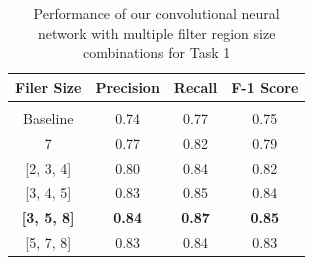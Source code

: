 \begin{table}[ht]
    \centering
    \caption{Performance of our convolutional neural network with multiple filter region size combinations for Task 1}
    \begin{tabular}{c  c  c  c}
         \toprule
         \textbf{Filer Size}        &   \textbf{Precision}      &   \textbf{Recall}            &   \textbf{F-1 Score}      \\
         \midrule
         \\[-1em]
         
         Baseline                   &   0.74                    &            0.77                       &   0.75                    \\

         7                          &   0.77                    &             0.82                       &   0.79                    \\
         
         [2, 3, 4]                  &   0.80                    &             0.84                       &   0.82                    \\

         [3, 4, 5]                  &   0.83                    &             0.85                       &   0.84                    \\

         \textbf{[3, 5, 8]}         &   \textbf{0.84}           &             \textbf{0.87}              &   \textbf{0.85}           \\
         
         [5, 7, 8]                  &   0.83                     &            0.84                       &   0.83                    \\
         
         \bottomrule
    \end{tabular}
    \label{table:task1-multiple-filter-results}
    \vspace{0.2in}
\end{table}

